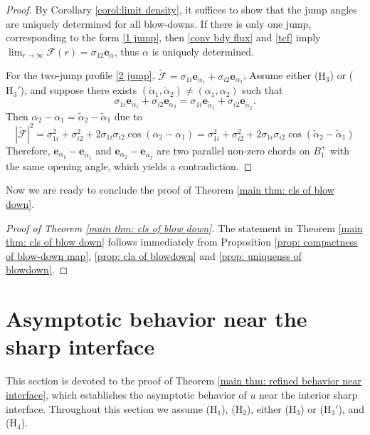 \documentclass[leqno,11pt]{amsart}
\let\al=\alpha
\theoremstyle{remark}
\begin{document}
\begin{proof}
    By Corollary \ref{corol:limit density}, it suffices to show that the jump angles are uniquely determined for all blow-downs. If there is only one jump, corresponding to the form \eqref{1 jump}, then \eqref{conv bdy flux} and \eqref{tcf} imply $\lim_{r\to\infty} \mathcal{F}(r)=\sigma_{12}\mathbf{e}_{\al}$, thus $\al$ is uniquely determined. 

    For the two-jump profile \eqref{2 jump}, $\widetilde{\mathcal{F}}= \sigma_{1i}\mathbf{e}_{\al_1}+\sigma_{i2}\mathbf{e}_{\al_2}$. Assume either ($\mathrm{H_3}$) or ($\mathrm{H_3'}$), and suppose there exists $(\tilde{\al}_1,\tilde{\al}_2)\neq (\al_1,\al_2)$ such that 
\[
\sigma_{1i}\mathbf{e}_{\al_1}+\sigma_{i2}\mathbf{e}_{\al_2}= \sigma_{1i}\mathbf{e}_{\tilde{\al}_1}+\sigma_{i2}\mathbf{e}_{\tilde{\al}_2}.
    \]
    Then $\al_2-\al_1=\tilde{\al}_2-\tilde{\al}_1$ due to 
    \begin{equation*}
        |\widetilde{\mathcal{F}}|^2=\sigma_{1i}^2+\sigma_{i2}^2+2\sigma_{1i}\sigma_{i2}\cos(\al_2-\al_1)= \sigma_{1i}^2+\sigma_{i2}^2+2\sigma_{1i}\sigma_{i2}\cos(\tilde{\al}_2-\tilde{\al}_1)
    \end{equation*}
    Therefore, $\mathbf{e}_{\al_1}-\mathbf{e}_{\tilde{\al}_1}$ and $\mathbf{e}_{\al_2}-\mathbf{e}_{\tilde{\al}_2}$ are two parallel non-zero chords on $B_1^+$ with the same opening angle, which yields a contradiction.  
    
\end{proof}



Now we are ready to conclude the proof of Theorem \ref{main thm: cls of blow down}.

\begin{proof}[Proof of Theorem \ref{main thm: cls of blow down}]
    The statement in Theorem \ref{main thm: cls of blow down} follows immediately from Proposition \ref{prop: compactness of blow-down map}, \ref{prop: cla of blowdown} and \ref{prop: uniquenss of blowdown}. 
\end{proof}

\section{Asymptotic behavior near the sharp interface}\label{sec:sharp interface}

This section is devoted to the proof of Theorem \ref{main thm: refined behavior near interface}, which establishes the asymptotic behavior of $u$ near the interior sharp interface. Throughout this section we assume ($\mathrm{H}_1$), ($\mathrm{H}_2$), either ($\mathrm{H}_3$) or ($\mathrm{H}_3'$), and ($\mathrm{H}_4$).
\end{document}
